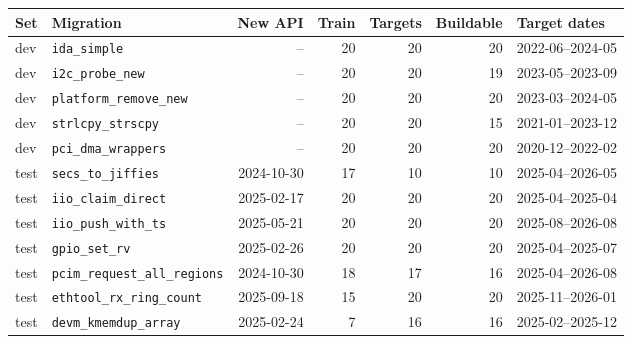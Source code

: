 \begin{tabular}{llrrrrl}
\toprule
Set & Migration & New API & Train & Targets & Buildable & Target dates \\
\midrule
dev & \texttt{ida\_simple} & -- & 20 & 20 & 20 & 2022-06--2024-05 \\
dev & \texttt{i2c\_probe\_new} & -- & 20 & 20 & 19 & 2023-05--2023-09 \\
dev & \texttt{platform\_remove\_new} & -- & 20 & 20 & 20 & 2023-03--2024-05 \\
dev & \texttt{strlcpy\_strscpy} & -- & 20 & 20 & 15 & 2021-01--2023-12 \\
dev & \texttt{pci\_dma\_wrappers} & -- & 20 & 20 & 20 & 2020-12--2022-02 \\
\midrule
test & \texttt{secs\_to\_jiffies} & 2024-10-30 & 17 & 10 & 10 & 2025-04--2026-05 \\
test & \texttt{iio\_claim\_direct} & 2025-02-17 & 20 & 20 & 20 & 2025-04--2025-04 \\
test & \texttt{iio\_push\_with\_ts} & 2025-05-21 & 20 & 20 & 20 & 2025-08--2026-08 \\
test & \texttt{gpio\_set\_rv} & 2025-02-26 & 20 & 20 & 20 & 2025-04--2025-07 \\
test & \texttt{pcim\_request\_all\_regions} & 2024-10-30 & 18 & 17 & 16 & 2025-04--2026-08 \\
test & \texttt{ethtool\_rx\_ring\_count} & 2025-09-18 & 15 & 20 & 20 & 2025-11--2026-01 \\
test & \texttt{devm\_kmemdup\_array} & 2025-02-24 & 7 & 16 & 16 & 2025-02--2025-12 \\
\bottomrule
\end{tabular}
